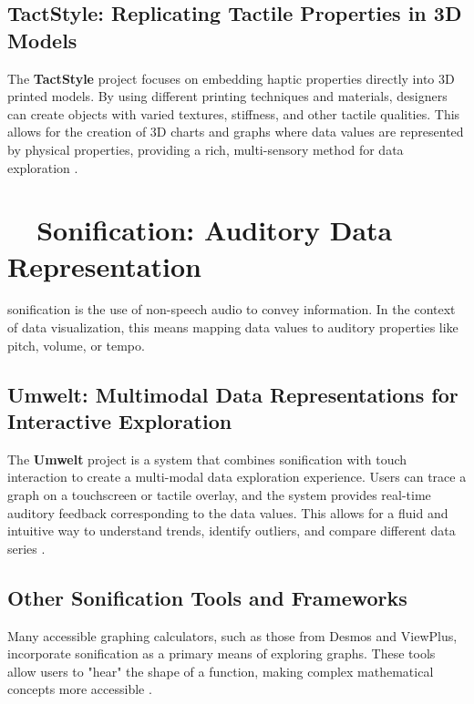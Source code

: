 \subsection{TactStyle: Replicating Tactile Properties in 3D Models}\label{ch13:ssec:tactstyle}
The \textbf{TactStyle} project focuses on embedding haptic properties directly into 3D printed models. By using different printing techniques and materials, designers can create objects with varied textures, stiffness, and other tactile qualities. This allows for the creation of 3D charts and graphs where data values are represented by physical properties, providing a rich, multi-sensory method for data exploration \supercite{TactStyle}.

\section{~~Sonification: Auditory Data Representation}\label{ch13:sec:sonification}
\gls{sonification} is the use of non-speech audio to convey information. In the context of data visualization, this means mapping data values to auditory properties like pitch, volume, or tempo.

\subsection{Umwelt: Multimodal Data Representations for Interactive Exploration}\label{ch13:ssec:umwelt}
The \textbf{Umwelt} project is a system that combines sonification with touch interaction to create a multi-modal data exploration experience. Users can trace a graph on a touchscreen or tactile overlay, and the system provides real-time auditory feedback corresponding to the data values. This allows for a fluid and intuitive way to understand trends, identify outliers, and compare different data series \supercite{Umwelt, Zong2024Umwelt}.

\subsection{Other Sonification Tools and Frameworks}\label{ch13:ssec:sonification-tools}
Many accessible graphing calculators, such as those from Desmos and ViewPlus, incorporate sonification as a primary means of exploring graphs. These tools allow users to "hear" the shape of a function, making complex mathematical concepts more accessible \supercite{Trayford2023STRAUSS, SonificationSandbox, TwoTone}.


